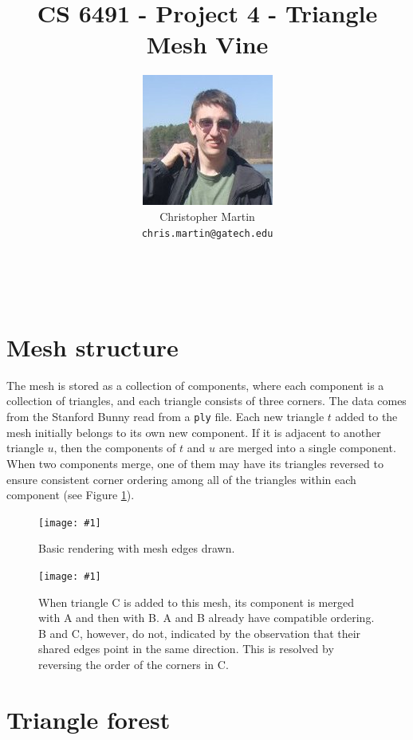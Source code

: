 \documentclass{article}
\title{\vspace{-60pt}CS 6491 - Project 4 - Triangle Mesh Vine}
\author{
\begin{tabular}{ll}
\multirow{3}{*}{\includegraphics[scale=0.4]{chris.jpg}}\\&
Christopher Martin\\&\texttt{chris.martin@gatech.edu}\end{tabular}
~\\~\\~\\}
\newcommand\screenshot[1]{\texttt{[image: \#1]}}
\begin{document}
\makeatletter
{}
\makeatother

\section{Mesh structure}

The mesh is stored as a collection of components,
where each component is a collection of triangles,
and each triangle consists of three corners.
The data comes from the Stanford Bunny\cite{bunny}
read from a {\tt ply} file.
Each new triangle $t$ added to the mesh initially
belongs to its own new component.
If it is adjacent to another triangle $u$,
then the components of $t$ and $u$ are merged
into a single component.
When two components merge, one of them may have
its triangles reversed to ensure consistent corner
ordering among all of the triangles within each
component (see Figure \ref{fig:flip}).

\begin{figure}
\centering
\screenshot{mesh}
\caption{Basic rendering with mesh edges drawn.}
\end{figure}

\begin{figure}
\centering
\screenshot{flip}
\caption{When triangle C is added to this mesh,
its component is merged with A and then with B.
A and B already have compatible ordering.
B and C, however, do not, indicated by the
observation that their shared edges point in
the same direction. This is resolved by reversing
the order of the corners in C.}
\label{fig:flip}
\end{figure}

\section{Triangle forest}
\end{document}
